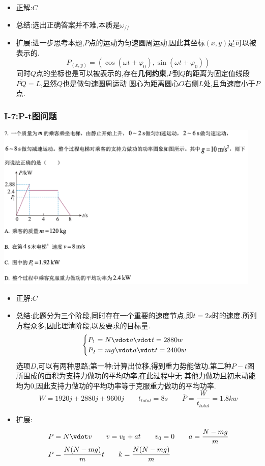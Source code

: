 \documentclass{article}
\begin{document}
\begin{itemize}
    \item 正解:\quad $C$
    \item 总结:\quad 选出正确答案并不难,本质是$\omega_{//}$
    \item 扩展:\quad 进一步思考本题,$P$点的运动为匀速圆周运动,因此其坐标$(x,y)$是可以被表示的.
          $$
              P_(x,y) = (\cos{(\omega t + \varphi_{0})} , \sin{(\omega t + \varphi_{0})})
          $$
          同时$Q$点的坐标也是可以被表示的,存在\textbf{几何约束},$P$到$Q$的距离为固定值线段$\overline{PQ} = L$,显然$Q$也是做匀速圆周运动
          圆心为距离圆心$O$右侧$L$处,且角速度小于$P$点.
\end{itemize}

\vspace{2em}

\subsubsection{I-7:P-t图问题}
\includegraphics[width=0.95\textwidth,keepaspectratio]{./pictures/1.2-2.png}

\begin{itemize}
    \item 正解:\quad $C$
    \item 总结:\quad 此题分为三个阶段,同时存在一个重要的速度节点,即$t = 2s$时的速度.所列方程众多,因此理清阶段,以及要求的目标量.
          $$
              \begin{cases}
                  P_{1} = N \vdot a \vdot t = 2880 w \\
                  P_{2} = mg \vdot a \vdot t  = 2400 w
              \end{cases}
          $$
          选项$D$,可以有两种思路;第一种:计算出位移,得到重力势能做功.第二种$P-t$图所围成的面积为支持力做功的平均功率,在此过程中无
          其他力做功且初末动能均为0,因此支持力做功的平均功率等于克服重力做功的平均功率.
          $$ W = 1920j + 2880j + 9600 j \qquad t_{total} = 8s \qquad \overline{P} = \frac{W}{t_{total}} = 1.8kw $$

    \item 扩展:
          \begin{align}
              P & = N \vdot v \qquad v = v_{0} + a t \qquad v_{0} = 0 \qquad a = \frac{N-mg}{m} \\
              P & = \frac{N(N-mg)}{m} t \qquad  k = \frac{N(N-mg)}{m}
          \end{align}
\end{itemize}
\end{document}
